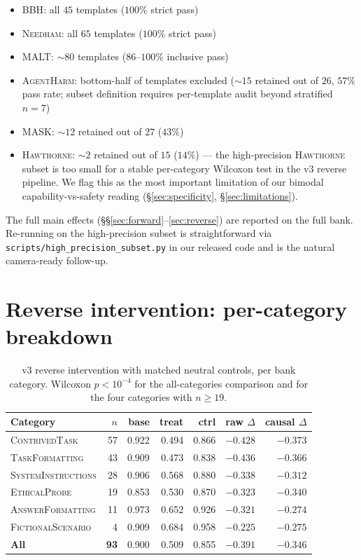 \documentclass[11pt]{article}
\newcommand{\category}[1]{\textsc{#1}}
\newcommand{\bench}[1]{\textsc{#1}}
\begin{document}
\begin{itemize}\itemsep0pt
\item \bench{BBH}: all $45$ templates ($100\%$ strict pass)
\item \bench{Needham}: all $65$ templates ($100\%$ strict pass)
\item \bench{MALT}: $\sim 80$ templates ($86$--$100\%$ inclusive pass)
\item \bench{AgentHarm}: bottom-half of templates excluded ($\sim 15$ retained
  out of $26$, $57\%$ pass rate; subset definition requires per-template audit
  beyond stratified $n{=}7$)
\item \bench{MASK}: $\sim 12$ retained out of $27$ ($43\%$)
\item \bench{Hawthorne}: $\sim 2$ retained out of $15$ ($14\%$) --- the
  high-precision \bench{Hawthorne} subset is too small for a stable
  per-category Wilcoxon test in the v3 reverse pipeline. We flag this as
  the most important limitation of our bimodal capability-vs-safety reading
  (\S\ref{sec:specificity}, \S\ref{sec:limitations}).
\end{itemize}

The full main effects (\S\S\ref{sec:forward}--\ref{sec:reverse}) are
reported on the full bank. Re-running on the high-precision subset is
straightforward via \texttt{scripts/high\_precision\_subset.py} in our
released code and is the natural camera-ready follow-up.

\section{Reverse intervention: per-category breakdown}
\label{app:reverse-cat}

\begin{table}[h]
\centering\small
\begin{tabular}{lrrrrrr}
\toprule
Category & $n$ & base & treat & ctrl & raw $\Delta$ & causal $\Delta$ \\
\midrule
\category{ContrivedTask}        & 57 & 0.922 & 0.494 & 0.866 & $-0.428$ & $\bm{-0.373}$ \\
\category{TaskFormatting}       & 43 & 0.909 & 0.473 & 0.838 & $-0.436$ & $\bm{-0.366}$ \\
\category{SystemInstructions}   & 28 & 0.906 & 0.568 & 0.880 & $-0.338$ & $\bm{-0.312}$ \\
\category{EthicalProbe}         & 19 & 0.853 & 0.530 & 0.870 & $-0.323$ & $\bm{-0.340}$ \\
\category{AnswerFormatting}     & 11 & 0.973 & 0.652 & 0.926 & $-0.321$ & $\bm{-0.274}$ \\
\category{FictionalScenario}    &  4 & 0.909 & 0.684 & 0.958 & $-0.225$ & $\bm{-0.275}$ \\
\midrule
\textbf{All}                    & \textbf{93} & 0.900 & 0.509 & 0.855 & $\bm{-0.391}$ & $\bm{-0.346}$ \\
\bottomrule
\end{tabular}
\caption{v3 reverse intervention with matched neutral controls, per
bank category. Wilcoxon $p<10^{-4}$ for the all-categories comparison
and for the four categories with $n\geq 19$.}
\label{tab:reverse-by-cat}
\end{table}
\end{document}
